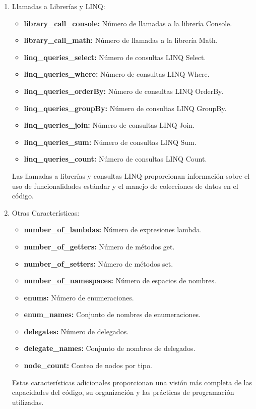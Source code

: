 \begin{enumerate}
    \item Llamadas a Librerías y LINQ:
    \begin{itemize}
        \item {\bf library\_call\_console:} Número de llamadas a la librería Console.
        \item {\bf library\_call\_math:} Número de llamadas a la librería Math.
        \item {\bf linq\_queries\_select:} Número de consultas LINQ Select.
        \item {\bf linq\_queries\_where:} Número de consultas LINQ Where.
        \item {\bf linq\_queries\_orderBy:} Número de consultas LINQ OrderBy.
        \item {\bf linq\_queries\_groupBy:} Número de consultas LINQ GroupBy.
        \item {\bf linq\_queries\_join:} Número de consultas LINQ Join.
        \item {\bf linq\_queries\_sum:} Número de consultas LINQ Sum.
        \item {\bf linq\_queries\_count:} Número de consultas LINQ Count.
    \end{itemize}
    Las llamadas a librerías y consultas LINQ proporcionan información sobre el uso de funcionalidades estándar y el manejo de colecciones de datos en el código.

    \item Otras Características:
    \begin{itemize}
        \item {\bf number\_of\_lambdas:} Número de expresiones lambda.
        \item {\bf number\_of\_getters:} Número de métodos get.
        \item {\bf number\_of\_setters:} Número de métodos set.
        \item {\bf number\_of\_namespaces:} Número de espacios de nombres.
        \item {\bf enums:} Número de enumeraciones.
        \item {\bf enum\_names:} Conjunto de nombres de enumeraciones.
        \item {\bf delegates:} Número de delegados.
        \item {\bf delegate\_names:} Conjunto de nombres de delegados.
        \item {\bf node\_count:} Conteo de nodos por tipo.
    \end{itemize}
    Estas características adicionales proporcionan una visión más completa de las capacidades del código, su organización y las prácticas de programación utilizadas.

 
\end{enumerate}
    
